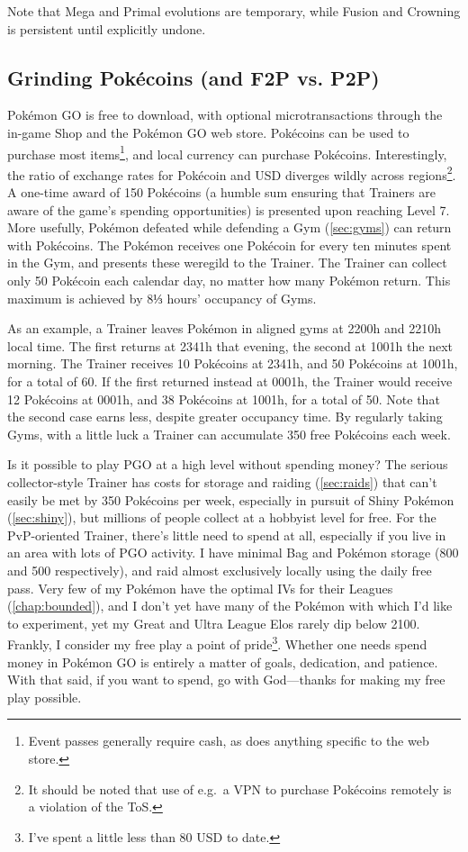 Note that Mega and Primal evolutions are temporary, while Fusion and Crowning is persistent
  until explicitly undone.
\subsection{Grinding Pokécoins (and F2P vs. P2P)}
\label{subsec:getcoins}
Pokémon GO is free to download, with optional microtransactions through the in-game
  Shop and the Pokémon GO web store.
Pokécoins can be used to purchase most items\footnote{Event passes generally require cash,
  as does anything specific to the web store.}, and local currency can purchase Pokécoins.
Interestingly, the ratio of exchange rates for Pokécoin and USD diverges
  wildly across regions\footnote{It should be noted that use of e.g.\ a VPN to purchase Pokécoins remotely is a
  violation of the ToS\@.}.
A one-time award of 150 Pokécoins (a humble sum ensuring that Trainers are aware of the game's spending opportunities)
  is presented upon reaching Level 7.
More usefully, Pokémon defeated while defending a Gym (\autoref{sec:gyms}) can
  return with Pokécoins.
The Pokémon receives one Pokécoin for every ten minutes spent in the Gym, and presents these weregild to the Trainer.
The Trainer can collect only 50 Pokécoin each calendar day, no matter how many Pokémon return.
This maximum is achieved by 8⅓ hours' occupancy of Gyms.

As an example, a Trainer leaves Pokémon in aligned gyms at 2200h and 2210h local time.
The first returns at 2341h that evening, the second at 1001h the next morning.
The Trainer receives 10 Pokécoins at 2341h, and 50 Pokécoins at 1001h, for a total of 60.
If the first returned instead at 0001h, the Trainer would receive 12 Pokécoins at 0001h,
  and 38 Pokécoins at 1001h, for a total of 50.
Note that the second case earns less, despite greater occupancy time.
By regularly taking Gyms, with a little luck a Trainer can accumulate 350 free Pokécoins each week.

Is it possible to play PGO at a high level without spending money?
The serious collector-style Trainer has costs for storage and raiding (\autoref{sec:raids})
  that can't easily be met by 350 Pokécoins per week, especially
  in pursuit of Shiny Pokémon (\autoref{sec:shiny}),
  but millions of people collect at a hobbyist level for free.
For the PvP-oriented Trainer, there's little need to spend at all,
  especially if you live in an area with lots of PGO activity.
I have minimal Bag and Pokémon storage (800 and 500 respectively), and raid almost exclusively locally using the daily free pass.
Very few of my Pokémon have the optimal IVs for their Leagues (\autoref{chap:bounded}),
  and I don't yet have many of the Pokémon with which I'd like to experiment,
  yet my Great and Ultra League Elos rarely dip below 2100.
Frankly, I consider my free play a point of pride\footnote{I've spent a little less than 80 USD to date.}.
Whether one needs spend money in Pokémon GO is entirely a matter of goals, dedication, and patience.
With that said, if you want to spend, go with God---thanks for making my free play possible.

